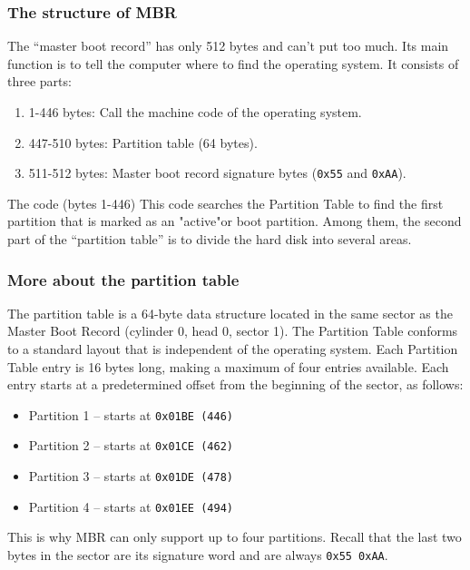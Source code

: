\documentclass[a4paper]{article}
\begin{document}
\subsubsection{The structure of MBR}

 The ``master boot record'' has only 512 bytes and can't put too much. Its main function is to tell the computer where to find the operating system. It consists of three parts:

\begin{enumerate}
	\item 1-446 bytes: Call the machine code of the operating system.
	\item 447-510 bytes: Partition table (64 bytes).
	\item 511-512 bytes: Master boot record signature bytes (\texttt{0x55} and \texttt{0xAA}). 
\end{enumerate}

The code (bytes 1-446) This code searches the Partition Table to find the first partition that is marked as an "active"or boot partition. Among them, the second part of the ``partition table'' is to divide the hard disk into several areas. 


\subsubsection{More about the partition table}

The partition table is a 64-byte data structure located in the same sector as the Master Boot Record (cylinder 0, head 0, sector 1). The Partition Table conforms to a standard layout that is independent of the operating system. Each Partition Table entry is 16 bytes long, making a maximum of four entries available. Each entry starts at a predetermined offset from the beginning of the sector, as follows:

\begin{itemize}
	\item Partition 1 -- starts at \texttt{0x01BE (446)}
	\item Partition 2 -- starts at \texttt{0x01CE (462)}
	\item Partition 3 -- starts at \texttt{0x01DE (478)}
	\item Partition 4 -- starts at \texttt{0x01EE (494)}
\end{itemize}
This is why MBR can only support up to four partitions. Recall that the last two bytes in the sector are its signature word and are always \texttt{0x55 0xAA}.
\end{document}
